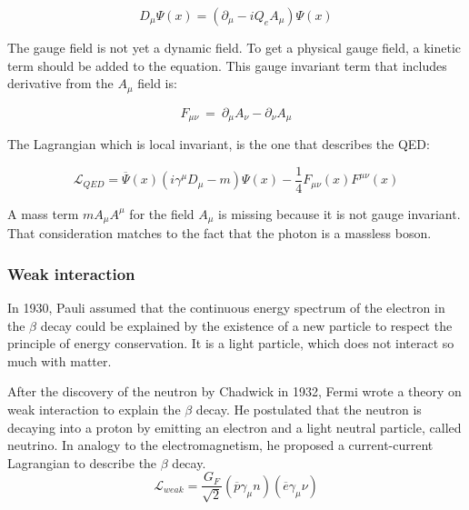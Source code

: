       \begin{equation}
        D_{\mu} \Psi\left(x\right) =  \left(\partial_{\mu} - i Q_e A_{\mu}\right) \Psi\left(x\right)
      \end{equation}

     The gauge field is not yet a dynamic field. To get a physical gauge field, a kinetic term should be added to the equation.
     This gauge invariant term that includes derivative from the $A_{\mu}$ field is:
    
     \begin{equation}
       F_{\mu \nu} \ = \ \partial_\mu A_\nu - \partial_\nu A_\mu
     \end{equation}

     The Lagrangian which is local invariant, is the one that describes the QED:

    \begin{equation}
    	\mathcal{L}_{QED} =  \overline{\Psi}\left(x\right)\left( i \gamma^\mu D_\mu - m \right) \Psi\left(x\right) - \frac{1}{4}F_{\mu \nu}\left(x\right) F^{\mu \nu}\left(x\right)
    \end{equation}

    A mass term $m A_{\mu} A^{\mu}$ for the field $A_{\mu}$ is missing because it is not gauge invariant. 
    That consideration matches to the fact that the photon is a massless boson.


    \subsubsection{Weak interaction}

    In 1930, Pauli assumed that the continuous energy spectrum of the electron in the $\beta$ decay could be explained by the existence of a new particle to respect the principle of energy conservation. 
    It is a light particle, which does not interact so much with matter.

    After the discovery of the neutron by Chadwick in 1932, Fermi wrote a theory on weak interaction to explain the $\beta$ decay. \cite{Fermi:1934hr} 
    He postulated that the neutron is decaying into a proton by emitting an electron and a light neutral particle, called neutrino.
    In analogy to the electromagnetism, he proposed a current-current Lagrangian to describe the $\beta$ decay.
    \begin{equation}
\mathcal{L}_{weak} = \frac{G_F}{\sqrt{2}}\left(\overline{p} \gamma_{\mu} n \right) \left(\overline{e} \gamma_{\mu} \nu \right)
    \end{equation}

